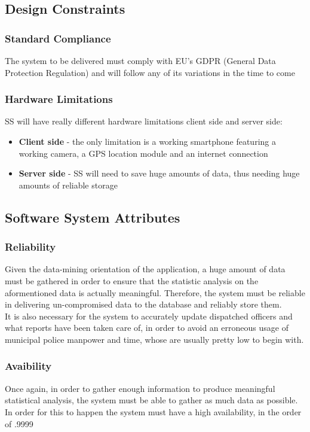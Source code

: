 \subsection{Design Constraints}
	\subsubsection{Standard Compliance}
	The system to be delivered must comply with EU's GDPR (General Data Protection Regulation) and will follow any of its variations in the time to come
	\subsubsection{Hardware Limitations}
	SS will have really different hardware limitations client side and server side:
	\begin{itemize}
		\item \textbf{Client side} - the only limitation is a working smartphone featuring a working camera, a GPS location module and an internet connection 
		\item \textbf{Server side} - SS will need to save huge amounts of data, thus needing huge amounts of reliable storage
	\end{itemize}
	 
\subsection{Software System Attributes}
	\subsubsection{Reliability}
	Given the data-mining orientation of the application, a huge amount of data must be gathered in order to ensure that the statistic analysis on the aformentioned data is actually meaningful. Therefore, the system must be reliable in delivering un-compromised data to the database and reliably store them.\\
	It is also necessary for the system to accurately update dispatched officers and what reports have been taken care of, in order to avoid an erroneous usage of municipal police manpower and time, whose are usually pretty low to begin with.
	\subsubsection{Avaibility}
	Once again, in order to gather enough information to produce meaningful statistical analysis, the system must be able to gather as much data as possible. In order for this to happen the system must have a high availability, in the order of .9999
